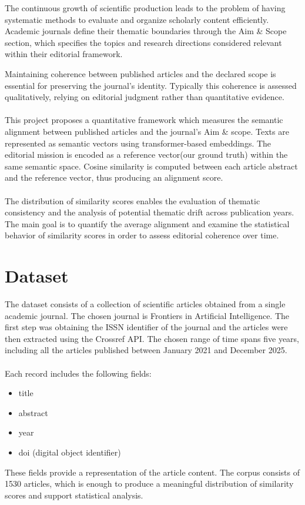 \documentclass[pdflatex,sn-mathphys-num]{sn-jnl}%
\theoremstyle{thmstyleone}%
\theoremstyle{thmstyletwo}%
\theoremstyle{thmstylethree}%
\begin{document}
The continuous growth of scientific production leads to the problem of having systematic methods to evaluate and organize scholarly content efficiently. Academic journals define their thematic boundaries through the Aim \& Scope section, which specifies the topics and research directions considered relevant within their editorial framework.

Maintaining coherence between published articles and the declared scope is essential for preserving the journal's identity.
Typically this coherence is assessed qualitatively, relying on editorial judgment rather than quantitative evidence.
\\ \\
This project proposes a quantitative framework which measures the semantic alignment between published articles and the journal's Aim \& scope. Texts are represented as semantic vectors using transformer-based embeddings.
The editorial mission is encoded as a reference vector(our ground truth) within the same semantic space. Cosine similarity is computed between each article abstract and the reference vector, thus producing an alignment score.
\\ \\
The distribution of similarity scores enables the evaluation of thematic consistency and the analysis of potential thematic drift across publication years.
The main goal is to quantify the average alignment and examine the statistical behavior of similarity scores in order to assess editorial coherence over time.

\section{Dataset}\label{sec2}

The dataset consists of a collection of scientific articles obtained from a single academic journal. The chosen journal is Frontiers in Artificial Intelligence. The first step was obtaining the ISSN identifier of the journal and the articles were then extracted using the Crossref API. The chosen range of time spans five years, including all the articles published between January 2021 and December 2025.\\\\
Each record includes the following fields:

\begin{itemize}
\item title
\item abstract
\item year
\item doi (digital object identifier)
\end{itemize}
These fields provide a representation of the article content. The corpus consists of 1530 articles, which is enough to produce a meaningful distribution of similarity scores and support statistical analysis.
\end{document}

